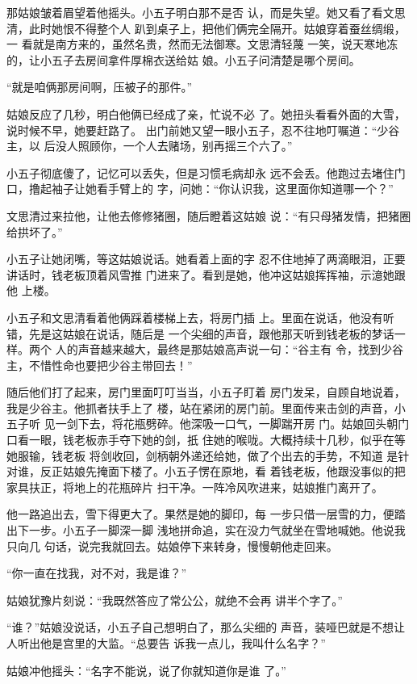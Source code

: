 那姑娘皱着眉望着他摇头。小五子明白那不是否
认，而是失望。她又看了看文思清，此时她恨不得整个人
趴到桌子上，把他们俩完全隔开。姑娘穿着蚕丝绸缎，一
看就是南方来的，虽然名贵，然而无法御寒。文思清轻蔑
一笑，说天寒地冻的，让小五子去房间拿件厚棉衣送给姑
娘。小五子问清楚是哪个房间。

“就是咱俩那房间啊，压被子的那件。”

姑娘反应了几秒，明白他俩已经成了亲，忙说不必
了。她扭头看看外面的大雪，说时候不早，她要赶路了。
出门前她又望一眼小五子，忍不往地叮嘱道：“少谷主，以
后没人照顾你，一个人去赌场，别再摇三个六了。”

小五子彻底傻了，记忆可以丢失，但是习惯毛病却永
远不会丢。他跑过去堵住门口，撸起袖子让她看手臂上的
字，问她：“你认识我，这里面你知道哪一个？”

文思清过来拉他，让他去修修猪圈，随后瞪着这姑娘
说：“有只母猪发情，把猪圈给拱坏了。”

小五子让她闭嘴，等这姑娘说话。她看着上面的字
忍不住地掉了两滴眼泪，正要讲话时，钱老板顶着风雪推
门进来了。看到是她，他冲这姑娘挥挥袖，示澺她跟他
上楼。

小五子和文思清看着他俩踩着楼梯上去，将房门插
上。里面在说话，他没有听错，先是这姑娘在说话，随后是
一个尖细的声音，跟他那天听到钱老板的梦话一样。两个
人的声音越来越大，最终是那姑娘高声说一句：“谷主有
令，找到少谷主，不惜性命也要把少谷主带回去！”

随后他们打了起来，房门里面叮叮当当，小五子盯着
房门发呆，自顾自地说着，我是少谷主。他抓者扶手上了
楼，站在紧闭的房门前。里面传来击剑的声音，小五子听
见一剑下去，将花瓶劈碎。他深吸一口气，一脚踹开房
门。姑娘回头朝门口看一眼，钱老板赤手夺下她的剑，扺
住她的喉咙。大概持续十几秒，似乎在等她服输，钱老板
将剑收回，剑柄朝外递还给她，做了个出去的手势，不知道
是针对谁，反正姑娘先掩面下楼了。小五子愣在原地，看
着钱老板，他跟没事似的把家具扶正，将地上的花瓶碎片
扫干净。一阵冷风吹进来，姑娘推门离开了。

他一路追出去，雪下得更大了。果然是她的脚印，每
一步只借一层雪的力，便踏出下一步。小五子一脚深一脚
浅地拼命追，实在没力气就坐在雪地喊她。他说我只向几
句话，说完我就回去。姑娘停下来转身，慢慢朝他走回来。

“你一直在找我，对不对，我是谁？”

姑娘犹豫片刻说：“我既然答应了常公公，就绝不会再
讲半个字了。”

“谁？”姑娘没说话，小五子自己想明白了，那么尖细的
声音，装哑巴就是不想让人听出他是宫里的大监。“总要告
诉我一点儿，我叫什么名字？”

姑娘冲他摇头：“名字不能说，说了你就知道你是谁
了。”

